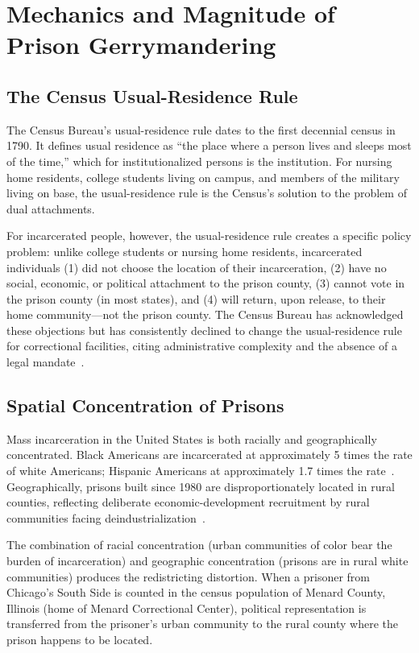 \section{Mechanics and Magnitude of Prison Gerrymandering}
\label{sec:mechanics}

\subsection{The Census Usual-Residence Rule}

The Census Bureau's usual-residence rule dates to the first decennial census in 1790. It defines usual residence as ``the place where a person lives and sleeps most of the time,'' which for institutionalized persons is the institution. For nursing home residents, college students living on campus, and members of the military living on base, the usual-residence rule is the Census's solution to the problem of dual attachments.

For incarcerated people, however, the usual-residence rule creates a specific policy problem: unlike college students or nursing home residents, incarcerated individuals (1) did not choose the location of their incarceration, (2) have no social, economic, or political attachment to the prison county, (3) cannot vote in the prison county (in most states), and (4) will return, upon release, to their home community---not the prison county. The Census Bureau has acknowledged these objections but has consistently declined to change the usual-residence rule for correctional facilities, citing administrative complexity and the absence of a legal mandate~\citep{census2021residence}.

\subsection{Spatial Concentration of Prisons}

Mass incarceration in the United States is both racially and geographically concentrated. Black Americans are incarcerated at approximately 5 times the rate of white Americans; Hispanic Americans at approximately 1.7 times the rate~\citep{sentencing2021trends}. Geographically, prisons built since 1980 are disproportionately located in rural counties, reflecting deliberate economic-development recruitment by rural communities facing deindustrialization~\citep{king2004prison}.

The combination of racial concentration (urban communities of color bear the burden of incarceration) and geographic concentration (prisons are in rural white communities) produces the redistricting distortion. When a prisoner from Chicago's South Side is counted in the census population of Menard County, Illinois (home of Menard Correctional Center), political representation is transferred from the prisoner's urban community to the rural county where the prison happens to be located.


